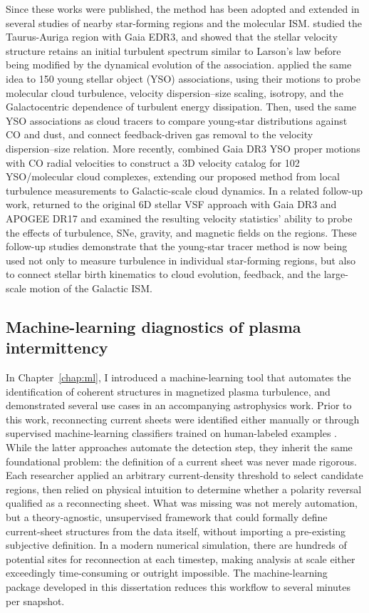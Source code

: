 Since these works were published, the method has been adopted and extended in several studies of nearby star-forming regions and the molecular ISM\@.
\citet{krolikowski_gaia_2021} studied the Taurus-Auriga region with Gaia EDR3, and showed that the stellar velocity structure retains an initial turbulent spectrum similar to Larson's law before being modified by the dynamical evolution of the association.
\citet{zhou_kinematics_2022} applied the same idea to 150 young stellar object (YSO) associations, using their motions to probe molecular cloud turbulence, velocity dispersion--size scaling, isotropy, and the Galactocentric dependence of turbulent energy dissipation.
Then, \citet{zhou_gas_2024} used the same YSO associations as cloud tracers to compare young-star distributions against CO and dust, and connect feedback-driven gas removal to the velocity dispersion--size relation.
More recently, \citet{zhou_kinematics_2025} combined Gaia DR3 YSO proper motions with CO radial velocities to construct a 3D velocity catalog for 102 YSO/molecular cloud complexes, extending our proposed method from local turbulence measurements to Galactic-scale cloud dynamics.
In a related follow-up work, \citet{velguth_probing_2025} returned to the original 6D stellar VSF approach with Gaia DR3 and APOGEE DR17 and examined the resulting velocity statistics' ability to probe the effects of turbulence, SNe, gravity, and magnetic fields on the regions.
These follow-up studies demonstrate that the young-star tracer method is now being used not only to measure turbulence in individual star-forming regions, but also to connect stellar birth kinematics to cloud evolution, feedback, and the large-scale motion of the Galactic ISM.


\subsection{Machine-learning diagnostics of plasma intermittency}

In Chapter~\ref{chap:ml}, I introduced a machine-learning tool that automates the identification of coherent structures in magnetized plasma turbulence, and demonstrated several use cases in an accompanying astrophysics work.
Prior to this work, reconnecting current sheets were identified either manually or through supervised machine-learning classifiers trained on human-labeled examples \citep[e.g.,][]{hu_identifying_2020}. 
While the latter approaches automate the detection step, they inherit the same foundational problem: the definition of a current sheet was never made rigorous. 
Each researcher applied an arbitrary current-density threshold to select candidate regions, then relied on physical intuition to determine whether a polarity reversal qualified as a reconnecting sheet. 
What was missing was not merely automation, but a theory-agnostic, unsupervised framework that could formally define current-sheet structures from the data itself, without importing a pre-existing subjective definition.
In a modern numerical simulation, there are hundreds of potential sites for reconnection at each timestep, making analysis at scale either exceedingly time-consuming or outright impossible.
The machine-learning package developed in this dissertation reduces this workflow to several minutes per snapshot.

